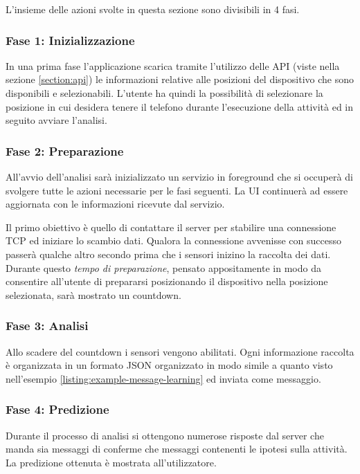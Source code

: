 L'insieme delle azioni svolte in questa sezione sono divisibili in 4 fasi.

\subsubsection{Fase 1: Inizializzazione}
In una prima fase l'applicazione scarica tramite l'utilizzo delle API (viste nella sezione \ref{section:api}) le informazioni relative
alle posizioni del dispositivo che sono disponibili e selezionabili.
L'utente ha quindi la possibilità di selezionare la posizione in cui desidera tenere il telefono durante l'esecuzione della attività ed 
in seguito avviare l'analisi.

\subsubsection{Fase 2: Preparazione}
All'avvio dell'analisi sarà inizializzato un servizio in foreground \cite{services} che si occuperà di svolgere tutte le azioni 
necessarie per le fasi seguenti. La UI continuerà ad essere aggiornata con le informazioni ricevute dal servizio.

Il primo obiettivo è quello di contattare il server per stabilire una connessione TCP ed iniziare lo scambio dati. 
Qualora la connessione avvenisse con successo passerà qualche altro secondo prima che i sensori inizino la raccolta dei dati.
Durante questo \textit{tempo di preparazione}, pensato appositamente in modo da consentire all'utente 
di prepararsi posizionando il dispositivo nella posizione selezionata, sarà mostrato un countdown.

\subsubsection{Fase 3: Analisi}
Allo scadere del countdown i sensori vengono abilitati. Ogni informazione raccolta è organizzata in un formato JSON organizzato in 
modo simile a quanto visto nell'esempio \ref{listing:example-message-learning} ed inviata come messaggio.

\subsubsection{Fase 4: Predizione}
Durante il processo di analisi si ottengono numerose risposte dal server che manda sia messaggi di conferme che messaggi
contenenti le ipotesi sulla attività.
La predizione ottenuta è mostrata all'utilizzatore.


